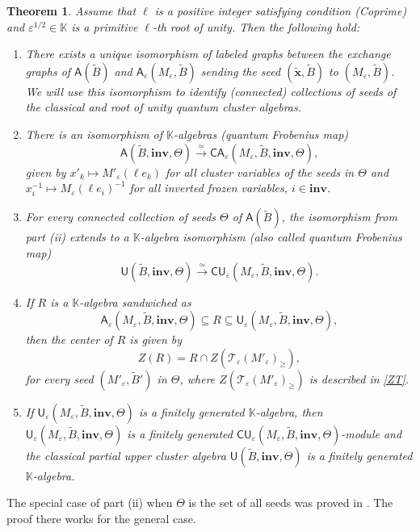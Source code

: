 \documentclass[11pt]{amsart}
\theoremstyle{plain}
\newtheorem{theorem}{Theorem}[section]
\newcommand \bth[1] { \begin{theorem}\label{t#1} }
\renewcommand {\eth} { \end{theorem} }
\def \KK {{\mathbb C}}
\def \KK {{\mathbb K}}
\def \A {{\boldsymbol{\mathsf A}}}
\def \C {{\boldsymbol{\mathsf C}}}
\def \U {{\boldsymbol{\mathsf U}}}
\def \B  {{\widetilde{B}}}
\newcommand \inv {{\mathbf{inv}}}
\def \x {{\wt{\mathbf{x}}}} %
\def \TT {{\mathcal{T}}}
\def \ep {\varepsilon}
\def \mt  {\mapsto}
\def \wt {\widetilde}
\begin{document}
\bth{cent-isom} Assume that $\ell$ is a positive integer satisfying condition (Coprime) and $\ep^{1/2} \in \KK$ is a primitive $\ell$-th root of unity. 
Then the following hold:
\begin{enumerate}
\item[(i)] \cite[Theorem 4.8]{NTY2}
There exists a unique isomorphism of labeled graphs between the exchange graphs of $\A(\B)$ and $\A_\ep(M_\ep,\B)$ sending the seed $(\x, \B)$ to $(M_\ep, \B)$. We will use this isomorphism to identify (connected) collections of seeds of the classical and root of unity quantum cluster algebras.
\item[(ii)] 
There is an isomorphism of $\KK$-algebras (quantum Frobenius map)
\[
\A(\B, \inv, \Theta) \stackrel{\simeq}{\longrightarrow} \C\A_\ep(M_\ep, \B, \inv, \Theta), 
\]
given by $x'_k \mt M'_\ep(\ell e_k)$ for all cluster variables of the seeds in $\Theta$ and 
$x_i^{-1} \mt M_\ep(\ell e_i)^{-1}$ for all inverted frozen variables, $i \in \inv$.
\item[(iii)] \cite[Proposition 3.2]{HLY}
For every connected collection of seeds $\Theta$ of $\A(\B)$, the isomorphism from part (ii) extends to a $\KK$-algebra isomorphism 
(also called quantum Frobenius map)
\[
\U(\B, \inv,\Theta) \stackrel{\simeq}{\longrightarrow} \C\U_\ep(M_\ep, \B, \inv, \Theta).
\]

\item[(iv)] \cite[Lemma 3.3]{HLY} If $R$ is a $\KK$-algebra sandwiched as 
\[
\A_\ep(M_\ep, \B, \inv, \Theta) \subseteq R \subseteq 
\U_\ep(M_\ep, \B, \inv,\Theta),
\]
then the center of $R$ is given by  
\[
Z(R) = R \cap Z(\TT_\ep(M'_\ep)_{\geq}),
\]
for every seed $(M'_\ep, \B')$ in $\Theta$, 
where $Z(\TT_\ep(M'_\ep)_\geq)$ is described in \eqref{ZT}.

\item[(v)] \cite[Theorem B]{HLY} If 
$\U_\ep(M_\ep, \B, \inv,\Theta)$ is a finitely generated $\KK$-algebra, then $\U_\ep(M_\ep, \B, \inv,\Theta)$ is a finitely generated 
$\C\U_\ep(M_\ep, \B, \inv,\Theta)$-module and the classical partial upper cluster algebra $\U(\B, \inv,\Theta)$ is a finitely generated $\KK$-algebra. 
\end{enumerate}
\eth
The special case of part (ii) when $\Theta$ is the set of all seeds was proved in
\cite[Theorem 4.6]{NTY2}. The proof there works for the general case.
\end{document}
